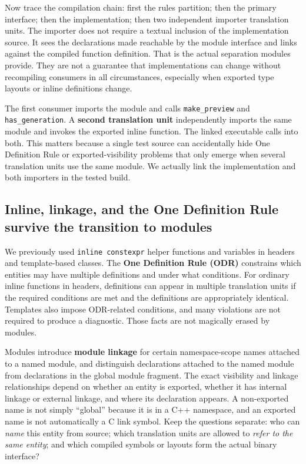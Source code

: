 Now trace the compilation chain: first the rules partition; then the primary interface; then the implementation; then two independent importer translation units. The importer does not require a textual inclusion of the implementation source. It sees the declarations made reachable by the module interface and links against the compiled function definition. That is the actual separation modules provide. They are not a guarantee that implementations can change without recompiling consumers in all circumstances, especially when exported type layouts or inline definitions change.

The first consumer imports the module and calls \texttt{make\_preview} and \texttt{has\_generation}. A \textbf{second translation unit} independently imports the same module and invokes the exported inline function. The linked executable calls into both. This matters because a single test source can accidentally hide One Definition Rule or exported-visibility problems that only emerge when several translation units use the same module. We actually link the implementation and both importers in the tested build.

\subsection{Inline, linkage, and the One Definition Rule survive the transition to modules}\label{05-engine-i-ch006-inline-linkage-and-the-one-definition-rule-survive-the-transition-to-modules}

We previously used \texttt{inline\ constexpr} helper functions and variables in headers and template-based classes. The \textbf{One Definition Rule (ODR)} constrains which entities may have multiple definitions and under what conditions. For ordinary inline functions in headers, definitions can appear in multiple translation units if the required conditions are met and the definitions are appropriately identical. Templates also impose ODR-related conditions, and many violations are not required to produce a diagnostic. Those facts are not magically erased by modules.

Modules introduce \textbf{module linkage} for certain namespace-scope names attached to a named module, and distinguish declarations attached to the named module from declarations in the global module fragment. The exact visibility and linkage relationships depend on whether an entity is exported, whether it has internal linkage or external linkage, and where its declaration appears. A non-exported name is not simply ``global'' because it is in a C++ namespace, and an exported name is not automatically a C link symbol. Keep the questions separate: who can \emph{name} this entity from source; which translation units are allowed to \emph{refer to the same entity}; and which compiled symbols or layouts form the actual binary interface?

